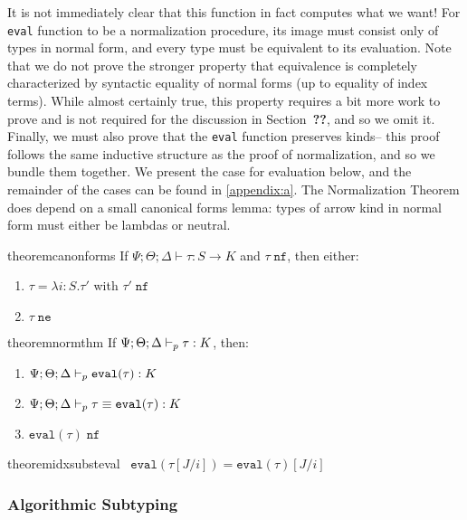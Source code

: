 It is not immediately clear that this function in fact computes what we want! For \texttt{eval} function to be a normalization procedure, its image must consist only of types in normal form, and every type must be equivalent to its evaluation. Note that we do not prove the stronger property that equivalence is completely characterized by syntactic equality of normal forms (up to equality of index terms). While almost certainly true, this property requires a bit more work to prove and is not required for the discussion in Section~\textbf{??}, and so we omit it. Finally, we must also prove that the \texttt{eval} function preserves kinds-- this proof follows the same inductive structure as the proof of normalization, and so we bundle them together. We present the case for evaluation below, and the remainder of the cases can be found in \autoref{appendix:a}. The Normalization Theorem does depend on a small canonical forms lemma: types of arrow kind in normal form must either be lambdas or neutral.

\begin{restatable}{theorem}{canonforms}
If $\Psi ; \Theta ; \Delta \vdash \tau : S \to K$ and $\tau \; \texttt{nf}$, then either:
\begin{enumerate}
  \item $\tau = \lambda i : S.\tau'$ with $\tau' \; \texttt{nf}$
  \item $\tau \; \texttt{ne}$
\end{enumerate}
\end{restatable}


\begin{restatable}{theorem}{normthm}
\label{thm:norm-thm}
If $\Psi ; \Theta ; \Delta \vdash_p \tau : K$, then:
\begin{enumerate}
  \item $\Psi ; \Theta ; \Delta \vdash_p \texttt{eval}(\tau) : K$
  \item $\Psi ; \Theta ; \Delta \vdash_p \tau \equiv \texttt{eval}(\tau) : K$
  \item $\texttt{eval}(\tau) \; \texttt{nf}$
\end{enumerate}
\end{restatable}


\begin{restatable}{theorem}{idxsubsteval}
~$\texttt{eval}(\tau[J/i]) = \texttt{eval}(\tau)[J/i]$
\label{thm:idx-subst-eval}
\end{restatable}

\subsubsection{Algorithmic Subtyping}

